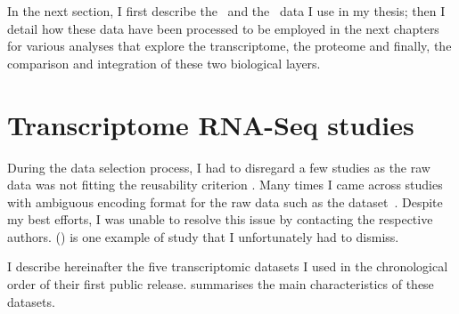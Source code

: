 In the next section, I first describe the \Rnaseq\ and the \ms\ data I use
in my thesis; then I detail how these data have been processed to be
employed in the next chapters for various analyses that explore the transcriptome,
the proteome and finally, the comparison and integration of these two
biological layers.


\section{Transcriptome RNA-Seq studies}\label{sec:rnaseq-data}

During the data selection process,
I had to disregard a few studies as the raw data was not fitting
the reusability criterion .
Many times I came across studies with ambiguous encoding
format for the raw data such
as the  dataset~.
Despite my best efforts,
I was unable to resolve this issue
by contacting the respective authors.
\citet{Burge} () is one example of study
that I unfortunately had to dismiss.

I describe hereinafter the five transcriptomic datasets I used
in the chronological order of their first public release.
 summarises the main characteristics of these datasets.

